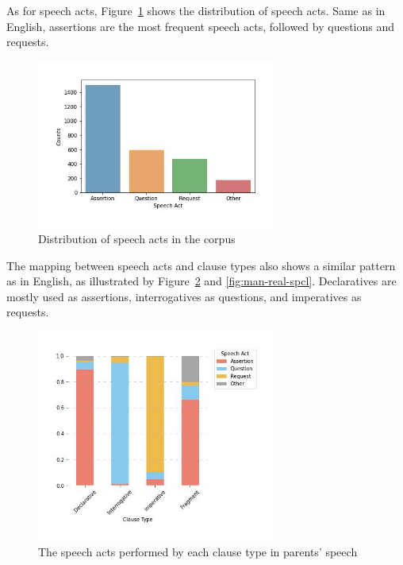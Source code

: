 As for speech acts, Figure~\ref{fig:man-real-sp} shows the distribution of speech acts. Same as in English, assertions are the most frequent speech acts, followed by questions and requests. 
\begin{figure}[H]
    \centering
    \includegraphics[width=0.7\textwidth]{figures/man-real-sp.jpg}
    \caption{Distribution of speech acts in the corpus}
    \label{fig:man-real-sp}
\end{figure}

The mapping between speech acts and clause types also shows a similar pattern as in English, as illustrated by Figure~\ref{fig:man-real-clsp} and \ref{fig:man-real-spcl}. Declaratives are mostly used as assertions, interrogatives as questions, and imperatives as requests. 

\begin{figure}[H]
    \centering
    \includegraphics[width=0.7\textwidth]{figures/man-real-clsp.jpg}
    \caption{The speech acts performed by each clause type in parents' speech}
    \label{fig:man-real-clsp}
\end{figure}

